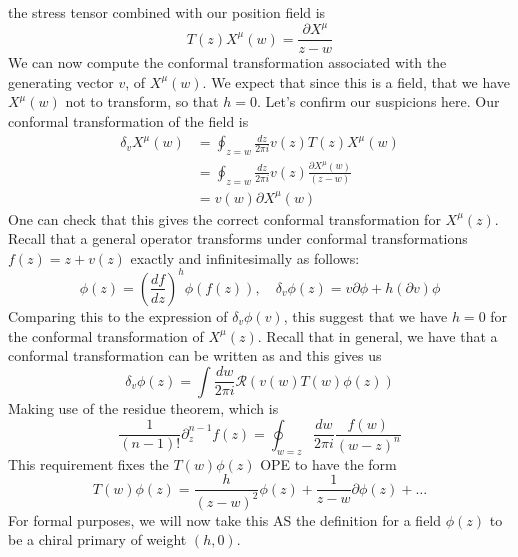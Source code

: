 \documentclass[11pt, oneside]{article}   	%
\theoremstyle{slanted}
\begin{document}
the stress tensor combined with our 
position field is 
\[
	T \left( z  \right)  X^ \mu \left(  w  \right)  
	 = \frac{\partial  X ^ \mu  }{ z - w } 
\] We can now compute the conformal transformation 
associated with the generating vector $ v  $, of 
$ X ^ \mu \left( w  \right)  $. We expect that 
since this is a field, that we have $ X^ \mu \left(  w  \right)  $
not to transform, so that $ h = 0$. Let's confirm our 
suspicions here. Our conformal 
transformation of the field is 
\begin{align*}
	\delta _ v X ^ \mu \left( w  \right)  &=  
	\oint_{ z = w } \frac{dz }{ 2 \pi i } v \left( z  \right)  T \left(  z  \right)  X ^ \mu 
	\left(  w  \right)  \\ 
					      &=  \oint_{ z = w } \frac{dz }{ 2 \pi i } v \left(  z \right)  \frac{
					      \partial  X ^ \mu \left( w   \right)  }{ \left(  z- w  \right)  }  \\
					      &=  v \left(  w  \right)  \partial  X ^ \mu \left(  w  \right)  
\end{align*} One can check 
that this gives the correct conformal transformation 
for $ X ^ \mu \left( z  \right)  $. Recall that 
a general operator transforms under conformal transformations $ f \left(  z  \right)  
 = z + v \left( z  \right)  $ exactly and infinitesimally as follows: 
 \[
	 \phi \left(  z  \right) = \left( \frac{df }{ dz }  \right)^{ h } \phi \left( 
	 f \left(  z  \right)  \right) , \quad 
	 \delta _ v \phi \left(  z  \right)   = 
	 v \partial  \phi + h ( \partial  v  )  \phi 
 \] Comparing this to the expression of 
 $ \delta _ v \phi \left( v  \right)  $, this suggest 
 that we have $ h = 0 $ for the conformal transformation 
 of $ X ^ \mu (z)$. Recall that in 
 general, we have that a conformal transformation 
 can be written as 
 and this gives us 
\[
   \delta _ v \phi \left(  z  \right)   = 
   \int \frac{d w}{2 \pi i  } \mathcal{ R } \left( v \left( w  \right)  T \left(  w  \right) \phi 
   \left(  z  \right)  \right)  
\] Making use of the residue theorem, 
which is 
\[
	\frac{1}{\left( n- 1  \right)  ! } 
	\partial  _ z ^{ n -1  } f \left(  z \right)   = \oint_{ w = z } 
	\frac{d w}{ 2 \pi i } \frac{ f \left(  w  \right)  }{\left(  w - z  \right) ^ n}
\] This requirement fixes the 
$ T \left( w  \right)  \phi \left(  z  \right)  $ OPE 
to have the form
\[
	T \left(  w  \right)  \phi \left(  z  \right)  = \frac{h }{ \left( z - w  \right)  ^ 2 } 
	\phi \left( z    \right)  + \frac{1}{ z - w  } \partial  \phi \left(  z  \right)  + \dots 
\] For formal purposes, we will now take this AS 
the definition for a field $ \phi \left(  z  \right)   $ 
to be a chiral primary of weight $ \left( h , 0  \right)  $. 
\end{document}
